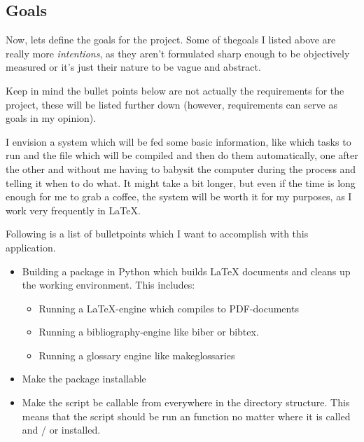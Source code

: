 \subsection{Goals}\label{sec:goals}
Now, lets define the goals for the project. Some of the{\glqq goals\grqq} I
listed above are really more \emph{intentions}, as they aren't formulated sharp
enough to be objectively measured or it's just their nature to be vague and
abstract.

Keep in mind the bullet points below are not actually the requirements for the
project, these will be listed further down (however, requirements can serve as
goals in my opinion).

I envision a system which will be fed some basic information, like which tasks
to run and the file which will be compiled and then do them automatically, one
after the other and without me having to babysit the computer during the
process and telling it when to do what. It might take a bit longer, but even if
the time is long enough for me to grab a coffee, the system will be worth it
for my purposes, as I work very frequently in {\LaTeX}.

Following is a list of bulletpoints which I want to accomplish with this
application.

\begin{itemize}
    \item Building a package in Python which builds {\LaTeX} documents and
        cleans up the working environment. This includes:
        \begin{itemize}
            \item Running a {\LaTeX}-engine which compiles to PDF-documents
            \item Running a bibliography-engine like biber or bibtex.
            \item Running a glossary engine like makeglossaries
        \end{itemize} 
    \item Make the package installable
    \item Make the script be callable from everywhere in the directory
        structure.  This means that the script should be run an function no
        matter where it is called and / or installed.
\end{itemize}

